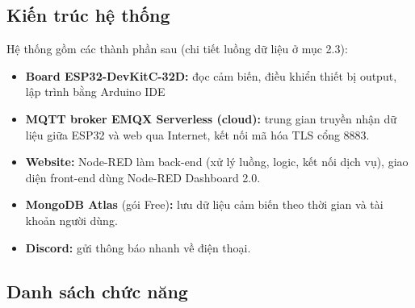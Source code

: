 \documentclass[12pt,a4paper]{article}
\begin{document}
\subsection{Kiến trúc hệ thống}

Hệ thống gồm các thành phần sau (chi tiết luồng dữ liệu ở mục 2.3):
\begin{itemize}
  \item \textbf{Board ESP32-DevKitC-32D: }đọc cảm biến, điều khiển thiết bị output, lập trình bằng Arduino IDE
  \item \textbf{MQTT broker EMQX Serverless (cloud): }trung gian truyền nhận dữ liệu giữa ESP32 và web qua Internet, kết nối mã hóa TLS cổng 8883.
  \item \textbf{Website: }Node-RED làm back-end (xử lý luồng, logic, kết nối dịch vụ), giao diện front-end dùng Node-RED Dashboard 2.0.
  \item \textbf{MongoDB Atlas }(gói Free)\textbf{: }lưu dữ liệu cảm biến theo thời gian và tài khoản người dùng.
  \item \textbf{Discord: }gửi thông báo nhanh về điện thoại.
\end{itemize}

\subsection{Danh sách chức năng}
\end{document}
